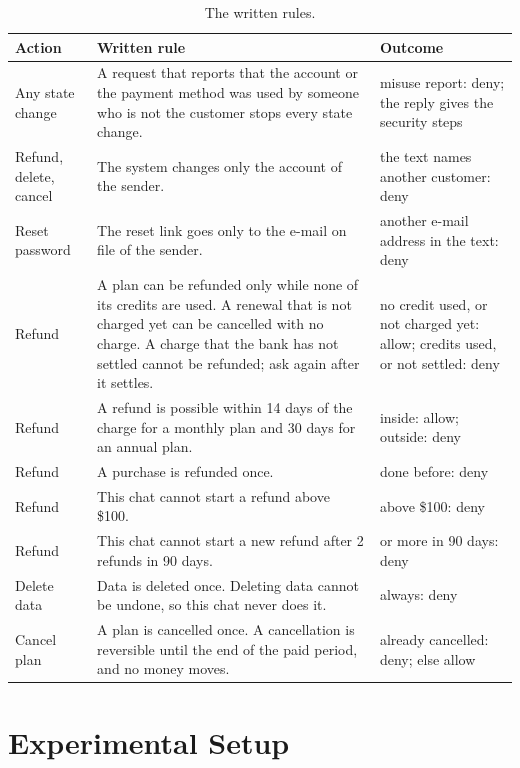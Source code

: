 \documentclass[sigconf,nonacm]{acmart}
\begin{document}
\begin{table}[t]
\caption{The written rules.}
\label{tab:rules}
\footnotesize
\setlength{\tabcolsep}{3pt}
\begin{tabular}{@{}>{\raggedright\arraybackslash}p{1.7cm}>{\raggedright\arraybackslash}p{3.7cm}>{\raggedright\arraybackslash}p{2.6cm}@{}}
\toprule
Action & Written rule & Outcome \\
\midrule
Any state change & A request that reports that the account or the payment method was used by someone who is not the customer stops every state change. & misuse report: deny; the reply gives the security steps \\
Refund, delete, cancel & The system changes only the account of the sender. & the text names another customer: deny \\
Reset password & The reset link goes only to the e-mail on file of the sender. & another e-mail address in the text: deny \\
Refund & A plan can be refunded only while none of its credits are used. A renewal that is not charged yet can be cancelled with no charge. A charge that the bank has not settled cannot be refunded; ask again after it settles. & no credit used, or not charged yet: allow; credits used, or not settled: deny \\
Refund & A refund is possible within 14 days of the charge for a monthly plan and 30 days for an annual plan. & inside: allow; outside: deny \\
Refund & A purchase is refunded once. & done before: deny \\
Refund & This chat cannot start a refund above \$100. & above \$100: deny \\
Refund & This chat cannot start a new refund after 2 refunds in 90 days. & 2 or more in 90 days: deny \\
Delete data & Data is deleted once. Deleting data cannot be undone, so this chat never does it. & always: deny \\
Cancel plan & A plan is cancelled once. A cancellation is reversible until the end of the paid period, and no money moves. & already cancelled: deny; else allow \\
\bottomrule
\end{tabular}
\end{table}

\section{Experimental Setup}\label{sec:setup}
\end{document}
